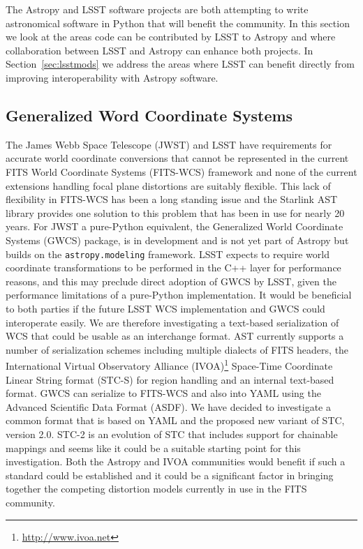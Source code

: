 \documentclass[]{spie}  %
\begin{document}
The Astropy and LSST software projects are both attempting to write astronomical software in Python that will benefit the community.
In this section we look at the areas code can be contributed by LSST to Astropy and where collaboration between LSST and Astropy can enhance both projects.
In Section~\ref{sec:lsstmods} we address the areas where LSST can benefit directly from improving interoperability with Astropy software.

\subsection{Generalized Word Coordinate Systems}

The James Webb Space Telescope (JWST)\cite{2006SSRv..123..485G} and LSST have requirements for accurate world coordinate conversions that cannot be represented in the current FITS World Coordinate Systems (FITS-WCS) framework\cite{2013ASPC..475...49H,2002A&A...395.1077C,2015A&C....12..133T} and none of the current extensions handling focal plane distortions\cite{2012SPIE.8451E..1MS,2012tpv} are suitably flexible.
This lack of flexibility in FITS-WCS has been a long standing issue and the Starlink AST library\cite{Berry201633} provides one solution to this problem that has been in use for nearly 20 years.
For JWST a pure-Python equivalent, the Generalized World Coordinate Systems (GWCS) package, is in development\cite{2016_P028_adassxxv} and is not yet part of Astropy but builds on the \texttt{astropy.modeling} framework.
LSST expects to require world coordinate transformations to be performed in the C++ layer for performance reasons, and this may preclude direct adoption of GWCS by LSST, given the performance limitations of a pure-Python implementation.
It would be beneficial to both parties if the future LSST WCS implementation and GWCS could interoperate easily.
We are therefore investigating a text-based serialization of WCS that could be usable as an interchange format.
AST currently supports a number of serialization schemes including multiple dialects of FITS headers, the International Virtual Observatory Alliance (IVOA)\footnote{\url{http://www.ivoa.net}} Space-Time Coordinate Linear String format (STC-S)\cite{2007ivoa.spec.1030R} for region handling\cite{2010ASPC..434..213B} and an internal text-based format.
GWCS can serialize to FITS-WCS and also into YAML\cite{2009yaml} using the Advanced Scientific Data Format (ASDF)\cite{2015A&C....12..240G}.
We have decided to investigate a common format that is based on YAML and the proposed new variant of STC, version 2.0.
STC-2\cite{2015ivoaSTC2} is an evolution of STC that includes support for chainable mappings and seems like it could be a suitable starting point for this investigation.
Both the Astropy and IVOA communities would benefit if such a standard could be established and it could be a significant factor in bringing together the competing distortion models currently in use in the FITS community.
\end{document}
